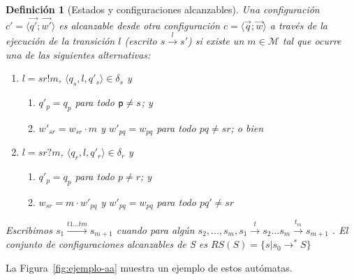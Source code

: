 \documentclass[paper=a4, fontsize=11pt, spanish]{scrartcl} %
\numberwithin{equation}{section} %
\numberwithin{figure}{section} %
\numberwithin{table}{section} %
\newtheorem{definition}{Definición}
\begin{document}
\begin{definition}[Estados y configuraciones alcanzables]
\label{def:estadosyconf}
  Una configuración $c' = \langle \overrightarrow{q'} ; \overrightarrow{w'} \rangle$ es \emph{alcanzable} desde otra  configuración $c = \langle \overrightarrow{q} ; \overrightarrow{w} \rangle$ a través de la \emph{ejecución de la transición} $l$ (escrito $s \overset{l}{\rightarrow} s'$) si existe un $m \in \mathcal{M}$ tal que ocurre una de las siguientes alternativas:
	\begin{enumerate}
		\item $l = sr!m$, $\langle q_s, l,  q'_s\rangle \in \delta_s$ y 
			\begin{enumerate}
				\item $q'_p = q_p$ para todo $\mathsf{p} \neq s$; y
				\item $w'_{sr} = w_{sr} \cdot m$ y  $w'_{pq} = w_{pq}$ para todo $pq \neq sr$; o bien
			\end{enumerate}
		\item $l = sr?m$, $\langle q_r, l,  q'_r\rangle \in \delta_r$ y 
			\begin{enumerate}
			\item $q'_{p} = q_{p}$ para todo $p \neq r$; y
				\item $w_{sr} = m \cdot w'_{pq}$ y $w'_{pq} = w_{pq}$ para todo $pq' \neq sr$
			\end{enumerate}
	\end{enumerate}
Escribimos $ s_1 \overset{t1...tm}{\rightarrow} s_{m+1}$ cuando para algún $s_2,...,s_m, s_1\overset{t}{\rightarrow} s_2...s_m\overset{t_m}{\rightarrow} s_{m+1} $ . El conjunto de configuraciones alcanzables de S es $RS(S) = \{s | s_0 \rightarrow^*S \}$
\end{definition}

La Figura~\ref{fig:ejemplo-aa} muestra un ejemplo de estos autómatas.
\end{document}
